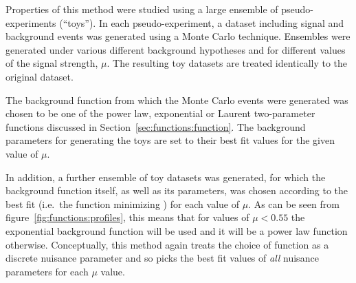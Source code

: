 Properties of this method were studied
using a large ensemble of
pseudo-experiments (``toys''). In each pseudo-experiment, a
dataset including signal and background events was generated using a Monte Carlo technique.
Ensembles were generated %
under various different background hypotheses and for different values of the signal strength, $\mu$.
The resulting toy datasets are treated identically to the original dataset.

The background function from which the Monte Carlo events were generated was chosen to be one of the power law,
exponential or Laurent two-parameter functions discussed in
Section~\ref{sec:functions:function}. The background parameters for generating the toys are set to their best fit values for the given value of $\mu$.

In addition, a further ensemble of toy datasets was generated, for which the background function itself, as well
as its parameters, was chosen according to the best fit (i.e.~the function minimizing \nll) for each value of $\mu$.
As can be seen from figure~\ref{fig:functions:profiles}, this means that for values of $\mu < 0.55$ the exponential background
function will be used and it will be a power law function otherwise.
Conceptually, this method again
treats the choice of function as a discrete nuisance parameter and so picks the
best fit values of {\em all\/} nuisance parameters for each $\mu$ value.


